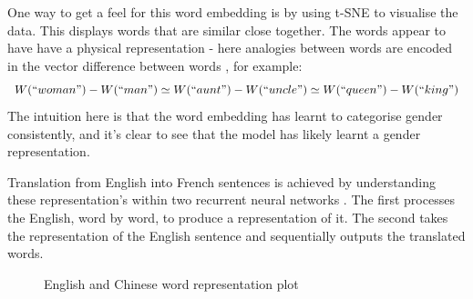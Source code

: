 \documentclass[a4paper,11pt,titlepage]{article}
\begin{document}
 		 \begin{figure}[H]
    			\caption{}%
    			\label{fig:words}
		\end{figure}
		
		One way to get a feel for this word embedding is by using t-SNE to visualise the data. This displays words that are similar close together. The words appear to have have a physical representation - here analogies between words are encoded in the vector difference between words \cite{Olah2014c}, for example:
		$$
		W(``woman") - W(``man") \simeq W(``aunt") - W(``uncle") \simeq W(``queen") - W(``king")
		$$
		The intuition here is that the word embedding has learnt to categorise gender consistently, and it's clear to see that the model has likely learnt a gender representation.
 		\par  		
		 Translation from English into French sentences is achieved by understanding these representation's within two recurrent neural networks \cite{Sutskever2014} . The first processes the English, word by word, to produce a representation of it. The second takes the representation of the English sentence and sequentially outputs the translated words.

 		\begin{figure}[H]
    			\caption{English and Chinese word representation plot}%
    			\label{fig:embeddings}
		\end{figure}	
		
\end{document}
